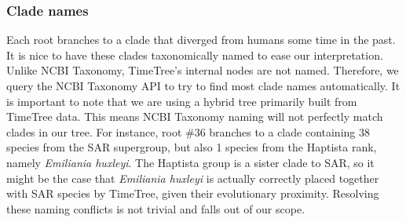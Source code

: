 \begin{Shaded}
\end{Shaded}

\hypertarget{clade-names}{%
\subsubsection{Clade names}\label{clade-names}}

Each root branches to a clade that diverged from humans some time in the
past. It is nice to have these clades taxonomically named to ease our
interpretation. Unlike NCBI Taxonomy, TimeTree's internal nodes are not
named. Therefore, we query the NCBI Taxonomy API to try to find most
clade names automatically. It is important to note that we are using a
hybrid tree primarily built from TimeTree data. This means NCBI Taxonomy
naming will not perfectly match clades in our tree. For instance, root
\#36 branches to a clade containing 38 species from the SAR supergroup,
but also 1 species from the Haptista rank, namely \emph{Emiliania
huxleyi}. The Haptista group is a sister clade to SAR, so it might be
the case that \emph{Emiliania huxleyi} is actually correctly placed
together with SAR species by TimeTree, given their evolutionary
proximity. Resolving these naming conflicts is not trivial and falls out
of our scope.

